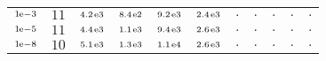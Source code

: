 \begin{tiny}
\begin{tabular}{@{$\;$}c@{$\;$}|@{$\;$}c@{$\;$}@{$\;$}c@{$\;$}@{$\;$}c@{$\;$}@{$\;$}c@{$\;$}@{$\;$}c@{$\;$}|@{$\;$}c@{$\;$}@{$\;$}c@{$\;$}@{$\;$}c@{$\;$}@{$\;$}c@{$\;$}@{$\;$}c@{$\;$}}
$\scriptstyle1\!\mathrm{\hspace{0.10em}e}-3$ & $\scriptstyle11$ & $\scriptstyle4.2\mathrm{\hspace{0.10em}e}3$ & $\scriptstyle8.4\mathrm{\hspace{0.10em}e}2$ & $\scriptstyle9.2\mathrm{\hspace{0.10em}e}3$ & $\scriptstyle2.4\mathrm{\hspace{0.10em}e}3$ & $\scriptstyle.$ & $\scriptstyle.$ & $\scriptstyle.$ & $\scriptstyle.$ & $\scriptstyle.$\\ 
$\scriptstyle1\!\mathrm{\hspace{0.10em}e}-5$ & $\scriptstyle11$ & $\scriptstyle4.4\mathrm{\hspace{0.10em}e}3$ & $\scriptstyle1.1\mathrm{\hspace{0.10em}e}3$ & $\scriptstyle9.4\mathrm{\hspace{0.10em}e}3$ & $\scriptstyle2.6\mathrm{\hspace{0.10em}e}3$ & $\scriptstyle.$ & $\scriptstyle.$ & $\scriptstyle.$ & $\scriptstyle.$ & $\scriptstyle.$\\ 
$\scriptstyle1\!\mathrm{\hspace{0.10em}e}-8$ & $\scriptstyle10$ & $\scriptstyle5.1\mathrm{\hspace{0.10em}e}3$ & $\scriptstyle1.3\mathrm{\hspace{0.10em}e}3$ & $\scriptstyle1.1\mathrm{\hspace{0.10em}e}4$ & $\scriptstyle2.6\mathrm{\hspace{0.10em}e}3$ & $\scriptstyle.$ & $\scriptstyle.$ & $\scriptstyle.$ & $\scriptstyle.$ & $\scriptstyle.$\\ 
\end{tabular} 
\end{tiny} 
